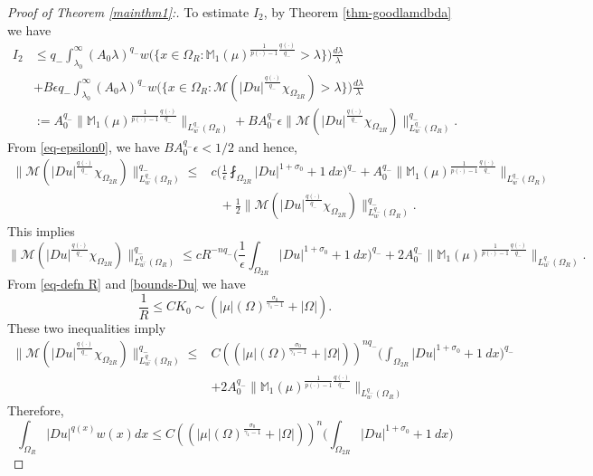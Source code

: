\documentclass[a4paper,10pt]{amsart}
\newcommand{\Mu}{\mathbb{M}_1(\mu)}
\newcommand{\pd}{p(\cdot)}
\newcommand{\f}{\frac}
\newcommand{\Om}{\Omega}
\newcommand{\vc}{\infty}
\begin{document}
\begin{proof}[Proof of Theorem \ref{mainthm1}:]
		To estimate $I_2$, by Theorem \ref{thm-goodlamdbda} we have
		$$
		\begin{aligned}
	    I_2&\leq q_-\int_{\lambda_0}^\vc (A_0\lambda)^{q_-}w\Big(\Big\{x\in \Om_{R}:\Mu^{\f{1}{\pd-1}\f{q(\cdot)}{q_-}} >   \lambda\Big\}\Big)\f{d\lambda}{\lambda}\\
	    & + B\epsilon q_-\int_{\lambda_0}^\vc (A_0\lambda)^{q_-}w\Big(\Big\{x\in \Om_{R}:\mathcal{M}(|Du|^{\f{q(\cdot)}{q_-}}\chi_{\Om_{2R}})> \lambda\Big\}\Big)\f{d\lambda}{\lambda}\\
	    &:=A_0^{q_-} \Big\|\Mu^{\f{1}{\pd-1}\f{q(\cdot)}{q_-}}\Big\|_{L^{q_-}_w(\Om_{R})}+BA_0^{q_-} \epsilon\Big\|\mathcal{M}(|Du|^{\f{q(\cdot)}{q_-}}\chi_{\Om_{2R}})\Big\|^{q_-}_{L^{q_-}_w(\Om_{R})}.
	    \end{aligned}
	    $$
	    From \eqref{eq-epsilon0}, we have $BA_0^{q_-} \epsilon<1/2$ and hence,
	    $$
	    \begin{aligned}
	    \Big\|\mathcal{M}(|Du|^{\f{q(\cdot)}{q_-}}\chi_{\Om_{2R}})\Big\|^{q_-}_{L^{q_-}_w(\Om_{R})}\leq& c\Big(\f{1}{\epsilon}\fint_{\Om_{2R}}|Du|^{1+\sigma_0} + 1 \ dx\Big)^{q_-}
	    +A_0^{q_-} \Big\|\Mu^{\f{1}{\pd-1}\f{q(\cdot)}{q_-}}\Big\|_{L^{q_-}_w(\Om_{R})}\\
	    & \ \ \ +\f{1}{2}\Big\|\mathcal{M}(|Du|^{\f{q(\cdot)}{q_-}}\chi_{\Om_{2R}})\Big\|^{q_-}_{L^{q_-}_w(\Om_{R})}.
	    \end{aligned}
	    $$
	    This implies
	    $$
	    \Big\|\mathcal{M}(|Du|^{\f{q(\cdot)}{q_-}}\chi_{\Om_{2R}})\Big\|^{q_-}_{L^{q_-}_w(\Om_{R})}\leq cR^{-nq_-}\Big(\f{1}{\epsilon}\int_{\Om_{2R}}|Du|^{1+\sigma_0} + 1 \ dx\Big)^{q_-}
	    +2A_0^{q_-} \Big\|\Mu^{\f{1}{\pd-1}\f{q(\cdot)}{q_-}}\Big\|_{L^{q_-}_w(\Om_{R})}.
	    $$
	    From \eqref{eq-defn R} and \eqref{bounds-Du} we have
	    $$
	    \f{1}{R}\leq CK_0 \sim (|\mu|(\Om)^{\f{\sigma_0}{\gamma_1-1}}+|\Om|).
	    $$
	    These two inequalities imply
	    $$
	     \begin{aligned}
	     \Big\|\mathcal{M}(|Du|^{\f{q(\cdot)}{q_-}}\chi_{\Om_{2R}})\Big\|^{q_-}_{L^{q_-}_w(\Om_{R})}\leq &C((|\mu|(\Om)^{\f{\sigma_0}{\gamma_1-1}}
	     +|\Om|))^{nq_-}\Big(\int_{\Om_{2R}}|Du|^{1+\sigma_0} + 1 \ dx\Big)^{q_-} \\
	     &+2A_0^{q_-} \Big\|\Mu^{\f{1}{\pd-1}\f{q(\cdot)}{q_-}}\Big\|_{L^{q_-}_w(\Om_{R})}
	     \end{aligned}
	   $$
	   Therefore,
	   	  \begin{equation}\label{eq-localestimates}
	    \int_{\Om_R}|Du|^{q(x)}w(x)dx \leq C((|\mu|(\Om)^{\f{\sigma_0}{\gamma_1-1}}+|\Om|))^{n}\Big(\int_{\Om_{2R}}|Du|^{1+\sigma_0} + 1 \ dx\Big)

\end{equation}
\end{proof}
\end{document}
